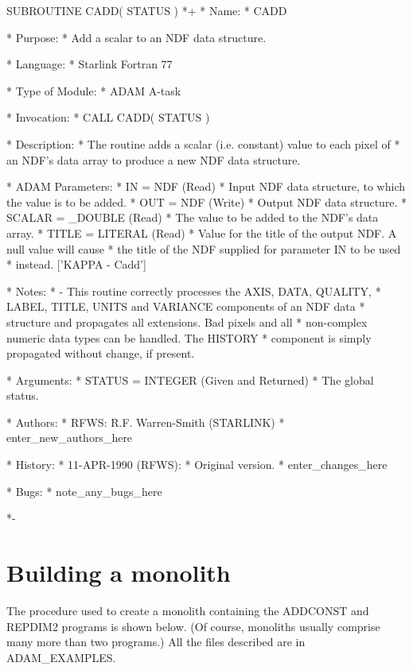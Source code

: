 \documentclass[twoside,11pt,nolof]{starlink}
\begin{document}
\begin{terminalv}
      SUBROUTINE CADD( STATUS )
*+
*  Name:
*     CADD

*  Purpose:
*     Add a scalar to an NDF data structure.

*  Language:
*     Starlink Fortran 77

*  Type of Module:
*     ADAM A-task

*  Invocation:
*     CALL CADD( STATUS )

*  Description:
*     The routine adds a scalar (i.e. constant) value to each pixel of
*     an NDF's data array to produce a new NDF data structure.

*  ADAM Parameters:
*     IN = NDF (Read)
*        Input NDF data structure, to which the value is to be added.
*     OUT = NDF (Write)
*        Output NDF data structure.
*     SCALAR = _DOUBLE (Read)
*        The value to be added to the NDF's data array.
*     TITLE = LITERAL (Read)
*        Value for the title of the output NDF. A null value will cause
*        the title of the NDF supplied for parameter IN to be used
*        instead. ['KAPPA - Cadd']

*  Notes:
*     -  This routine correctly processes the AXIS, DATA, QUALITY,
*     LABEL, TITLE, UNITS and VARIANCE components of an NDF data
*     structure and propagates all extensions. Bad pixels and all
*     non-complex numeric data types can be handled. The HISTORY
*     component is simply propagated without change, if present.

*  Arguments:
*     STATUS = INTEGER (Given and Returned)
*        The global status.

*  Authors:
*     RFWS: R.F. Warren-Smith (STARLINK)
*     {enter_new_authors_here}

*  History:
*     11-APR-1990 (RFWS):
*        Original version.
*     {enter_changes_here}

*  Bugs:
*     {note_any_bugs_here}

*-
\end{terminalv}

\newpage
\section{Building a monolith\label{monolith}}

The procedure used to create a monolith containing the ADDCONST and REPDIM2
programs is shown below.
(Of course, monoliths usually comprise many more than two programs.)
All the files described are in ADAM\_EXAMPLES.
\end{document}
